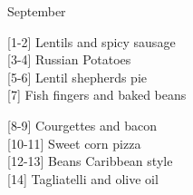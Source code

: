 		\begin{menu}{September}
    
    \begin{recipelist}
    
        {\scriptsize[1-2]} Lentils and spicy sausage\\
        {\scriptsize[3-4]} Russian Potatoes\\
        {\scriptsize[5-6]} Lentil shepherds pie\\
        {\scriptsize[7]} Fish fingers and baked beans\\%
    \end{recipelist}%
    \begin{recipelist}
    
        {\scriptsize[8-9]} Courgettes and bacon\\
        {\scriptsize[10-11]} Sweet corn pizza\\
        {\scriptsize[12-13]} Beans Caribbean style\\
        {\scriptsize[14]} Tagliatelli and olive oil\\%
    \end{recipelist}\par%
  

\end{menu}
